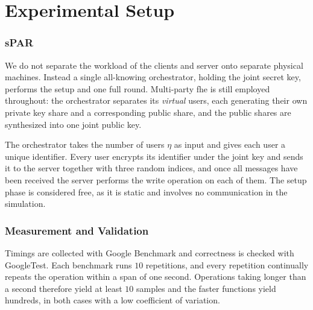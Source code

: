 \newpage
\section{Experimental Setup}
\label{sec:impl:setup}

\subsubsection{sPAR}
We do not separate the workload of the clients and server onto separate physical machines. Instead a single all-knowing orchestrator, holding the joint secret key, performs the setup and one full round. Multi-party \gls{fhe} is still employed throughout: the orchestrator separates its \emph{virtual} users, each generating their own private key share and a corresponding public share, and the public shares are synthesized into one joint public key.

The orchestrator takes the number of users $\eta$ as input and gives each user a unique identifier. Every user encrypts its identifier under the joint key and sends it to the server together with three random indices, and once all messages have been received the server performs the write operation on each of them. The setup phase is considered free, as it is static and involves no communication in the simulation.

\subsubsection{Measurement and Validation}
Timings are collected with Google Benchmark and correctness is checked with GoogleTest. Each benchmark runs $10$ repetitions, and every repetition continually repeats the operation within a span of one second. Operations taking longer than a second therefore yield at least $10$ samples and the faster functions yield hundreds, in both cases with a low coefficient of variation. 


